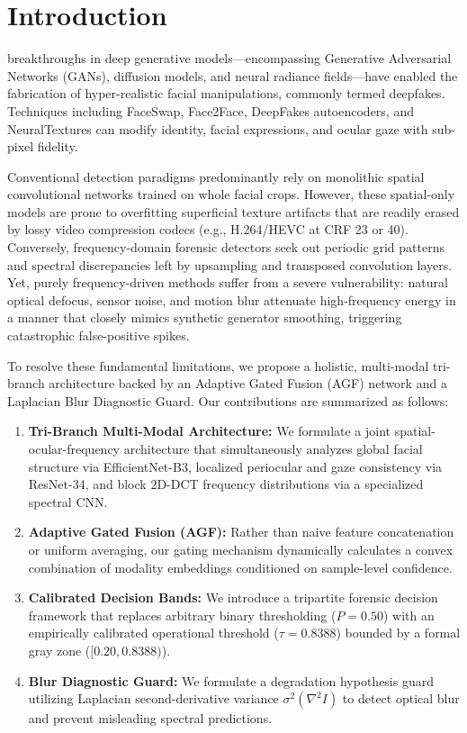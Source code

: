 \documentclass[journal,10pt,twocolumn]{IEEEtran}
\begin{document}
\section{Introduction}
 breakthroughs in deep generative models—encompassing Generative Adversarial Networks (GANs), diffusion models, and neural radiance fields—have enabled the fabrication of hyper-realistic facial manipulations, commonly termed deepfakes. Techniques including FaceSwap, Face2Face, DeepFakes autoencoders, and NeuralTextures can modify identity, facial expressions, and ocular gaze with sub-pixel fidelity. 

Conventional detection paradigms predominantly rely on monolithic spatial convolutional networks trained on whole facial crops. However, these spatial-only models are prone to overfitting superficial texture artifacts that are readily erased by lossy video compression codecs (e.g., H.264/HEVC at CRF 23 or 40). Conversely, frequency-domain forensic detectors seek out periodic grid patterns and spectral discrepancies left by upsampling and transposed convolution layers. Yet, purely frequency-driven methods suffer from a severe vulnerability: natural optical defocus, sensor noise, and motion blur attenuate high-frequency energy in a manner that closely mimics synthetic generator smoothing, triggering catastrophic false-positive spikes.

To resolve these fundamental limitations, we propose a holistic, multi-modal tri-branch architecture backed by an Adaptive Gated Fusion (AGF) network and a Laplacian Blur Diagnostic Guard. Our contributions are summarized as follows:
\begin{enumerate}
    \item \textbf{Tri-Branch Multi-Modal Architecture:} We formulate a joint spatial-ocular-frequency architecture that simultaneously analyzes global facial structure via EfficientNet-B3, localized periocular and gaze consistency via ResNet-34, and block 2D-DCT frequency distributions via a specialized spectral CNN.
    \item \textbf{Adaptive Gated Fusion (AGF):} Rather than naive feature concatenation or uniform averaging, our gating mechanism dynamically calculates a convex combination of modality embeddings conditioned on sample-level confidence.
    \item \textbf{Calibrated Decision Bands:} We introduce a tripartite forensic decision framework that replaces arbitrary binary thresholding ($P=0.50$) with an empirically calibrated operational threshold ($\tau = 0.8388$) bounded by a formal gray zone ($[0.20, 0.8388)$).
    \item \textbf{Blur Diagnostic Guard:} We formulate a degradation hypothesis guard utilizing Laplacian second-derivative variance $\sigma^2(\nabla^2 I)$ to detect optical blur and prevent misleading spectral predictions.
\end{enumerate}
\end{document}
